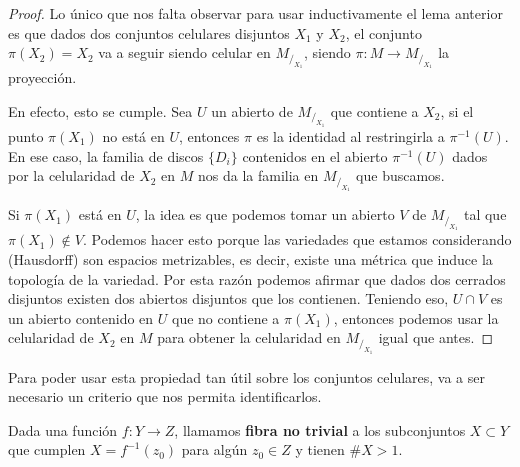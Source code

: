\begin{proof}
    Lo único que nos falta observar para usar inductivamente el lema anterior es que dados dos conjuntos celulares disjuntos $X_1$ y $X_2$, el conjunto $\pi(X_2)=X_2$ va a seguir siendo celular en $M_{/_{X_1}}$, siendo $\pi\colon M\to M_{/_{X_1}}$ la proyección.

    En efecto, esto se cumple. Sea $U$ un abierto de $M_{/_{X_1}}$ que contiene a $X_2$, si el punto $\pi(X_1)$ no está en $U$, entonces $\pi$ es la identidad al restringirla a $\pi^{-1}(U)$. En ese caso, la familia de discos $\{D_i\}$ contenidos en el abierto $\pi^{-1}(U)$ dados por la celularidad de $X_2$ en $M$ nos da la familia en $M_{/_{X_1}}$ que buscamos. 
    
    Si $\pi(X_1)$ está en $U$, la idea es que podemos tomar un abierto $V$ de $M_{/_{X_1}}$ tal que $\pi(X_1)\not\in V$. Podemos hacer esto porque las variedades que estamos considerando (Hausdorff) son espacios metrizables, es decir, existe una métrica que induce la topología de la variedad. Por esta razón podemos afirmar que dados dos cerrados disjuntos existen dos abiertos disjuntos que los contienen. Teniendo eso, $U\cap V$ es un abierto contenido en $U$ que no contiene a $\pi(X_1)$, entonces podemos usar la celularidad de $X_2$ en $M$ para obtener la celularidad en $M_{/_{X_1}}$ igual que antes.    %
\end{proof}

Para poder usar esta propiedad tan útil sobre los conjuntos celulares, va a ser necesario un criterio que nos permita identificarlos.

\begin{df}
Dada una función $f:Y\to Z$, llamamos \textbf{fibra no trivial} a los subconjuntos $X\subset Y$ que cumplen $X=f^{-1}(z_0)$ para algún $z_0\in Z$ y tienen $\#X > 1$.
\end{df}%


